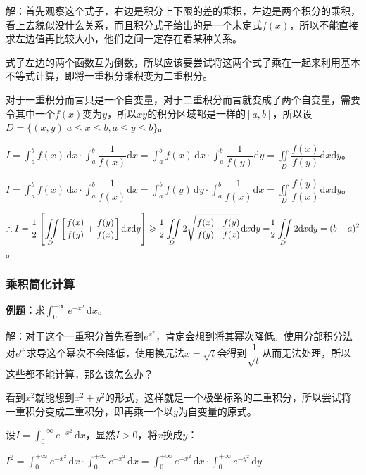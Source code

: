 \documentclass[UTF8, 12pt]{ctexart}
\begin{document}
解：首先观察这个式子，右边是积分上下限的差的乘积，左边是两个积分的乘积，看上去貌似没什么关系，而且积分式子给出的是一个未定式$f(x)$，所以不能直接求左边值再比较大小，他们之间一定存在着某种关系。

式子左边的两个函数互为倒数，所以应该要尝试将这两个式子乘在一起来利用基本不等式计算，即将一重积分乘积变为二重积分。

对于一重积分而言只是一个自变量，对于二重积分而言就变成了两个自变量，需要令其中一个$f(x)$变为$y$，所以$xy$的积分区域都是一样的$[a,b]$，所以设$D=\{(x,y)\vert a\leqslant x\leqslant b,a\leqslant y\leqslant b\}$。

$I=\displaystyle{\int_a^bf(x)\,\textrm{d}x\cdot\int_a^b\dfrac{1}{f(x)}\textrm{d}x}=\int_a^bf(x)\,\textrm{d}x\cdot\int_a^b\dfrac{1}{f(y)}\textrm{d}y=\iint\limits_D\dfrac{f(x)}{f(y)}\textrm{d}x\textrm{d}y$。

$I=\displaystyle{\int_a^bf(x)\,\textrm{d}x\cdot\int_a^b\dfrac{1}{f(x)}\textrm{d}x}=\int_a^bf(y)\,\textrm{d}y\cdot\int_a^b\dfrac{1}{f(x)}\textrm{d}x=\iint\limits_D\dfrac{f(y)}{f(x)}\textrm{d}x\textrm{d}y$。

$\therefore I=\displaystyle{\dfrac{1}{2}\left[\iint\limits_D\left[\dfrac{f(x)}{f(y)}+\dfrac{f(y)}{f(x)}\right]\textrm{d}x\textrm{d}y\right]\geqslant\dfrac{1}{2}\iint\limits_D2\sqrt{\dfrac{f(x)}{f(y)}\cdot\dfrac{f(y)}{f(x)}}\textrm{d}x\textrm{d}y=}\\\displaystyle{\dfrac{1}{2}\iint\limits_D2\textrm{d}x\textrm{d}y}=(b-a)^2$。

\subsubsection{乘积简化计算}

\textbf{例题：}求$\int_0^{+\infty}e^{-x^2}\,\textrm{d}x$。

解：对于这个一重积分首先看到$e^{x^2}$，肯定会想到将其幂次降低。使用分部积分法对$e^{e^2}$求导这个幂次不会降低，使用换元法$x=\sqrt{t}$会得到$\dfrac{1}{\sqrt{t}}$从而无法处理，所以这些都不能计算，那么该怎么办？

看到$x^2$就能想到$x^2+y^2$的形式，这样就是一个极坐标系的二重积分，所以尝试将一重积分变成二重积分，即再乘一个以$y$为自变量的原式。

设$I=\int_0^{+\infty}e^{-x^2}\,\textrm{d}x$，显然$I>0$，将$x$换成$y$：

$I^2=\int_0^{+\infty}e^{-x^2}\,\textrm{d}x\cdot\int_0^{+\infty}e^{-x^2}\,\textrm{d}x=\int_0^{+\infty}e^{-x^2}\,\textrm{d}x\cdot\int_0^{+\infty}e^{-y^2}\,\textrm{d}y$
\end{document}
